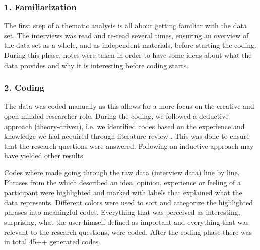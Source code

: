     \subsubsection{1. Familiarization}
    The first step of a thematic analysis is all about getting familiar with the data set. The interviews was read and re-read several times, ensuring an overview of the data set as a whole, and as independent materials, before starting the coding. During this phase, notes were taken in order to have some ideas about what the data provides and why it is interesting before coding starts.
    
    \subsubsection{2. Coding}
    The data was coded manually as this allows for a more focus on the creative and open minded researcher role. 
    During the coding, we followed a deductive approach (theory-driven), i.e. we identified codes based on the experience and knowledge we had acquired through literature review \cite{braun_using_2006}. This was done to ensure that the research questions were answered. Following an inductive approach may have yielded other results.
    
    Codes where made going through the raw data (interview data) line by line. Phrases from the which described an idea, opinion, experience or feeling of a participant were highlighted and marked with labels that explained what the data represents. Different colors were used to sort and categorize the highlighted phrases into meaningful codes. Everything that was perceived as interesting, surprising, what the user himself defined as important and everything that was relevant to the research questions, were coded. After the coding phase there was in total 45++ generated codes.  
    

